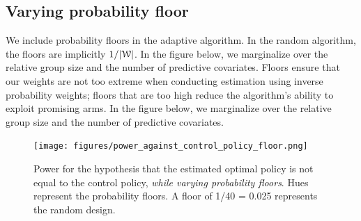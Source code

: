 \documentclass[letterpaper, 12pt, parskip=full,DIV=10]{scrartcl}
\begin{document}
\subsection{Varying probability floor}
We include probability floors in the adaptive algorithm. In the random algorithm, the floors are implicitly $ 1/ |{\EuScript W}|$. In the figure below, we marginalize over the relative group size and the number of predictive covariates. Floors ensure that our weights are not too extreme when conducting estimation using inverse probability weights; floors that are too high reduce the algorithm's ability to exploit promising arms. In the figure below, we marginalize over the relative group size and the number of predictive covariates.  

\begin{figure}[H]
\centering
\texttt{[image: figures/power\_against\_control\_policy\_floor.png]}
\caption{Power for the hypothesis that the estimated optimal policy is not equal to the control policy, \textit{while varying probability floors}. Hues represent the probability floors. A floor of 1/40 = 0.025 represents the random design. }
\label{fig:power_control_floor}
\end{figure}

%
%
\end{document}
